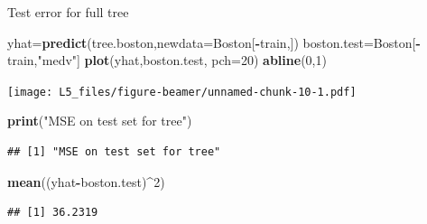\documentclass[
  ignorenonframetext,
]{beamer}
\newenvironment{Shaded}{\begin{snugshade}}{\end{snugshade}}
\newcommand{\DataTypeTok}[1]{\textcolor[rgb]{0.13,0.29,0.53}{#1}}
\newcommand{\DecValTok}[1]{\textcolor[rgb]{0.00,0.00,0.81}{#1}}
\newcommand{\KeywordTok}[1]{\textcolor[rgb]{0.13,0.29,0.53}{\textbf{#1}}}
\newcommand{\NormalTok}[1]{#1}
\newcommand{\OperatorTok}[1]{\textcolor[rgb]{0.81,0.36,0.00}{\textbf{#1}}}
\newcommand{\StringTok}[1]{\textcolor[rgb]{0.31,0.60,0.02}{#1}}
\begin{document}
\begin{frame}[fragile]

\begin{block}{Test error for full tree}

\begin{Shaded}
\begin{Highlighting}[]
\NormalTok{yhat=}\KeywordTok{predict}\NormalTok{(tree.boston,}\DataTypeTok{newdata=}\NormalTok{Boston[}\OperatorTok{-}\NormalTok{train,])}
\NormalTok{boston.test=Boston[}\OperatorTok{-}\NormalTok{train,}\StringTok{"medv"}\NormalTok{]}
\KeywordTok{plot}\NormalTok{(yhat,boston.test, }\DataTypeTok{pch=}\DecValTok{20}\NormalTok{)}
\KeywordTok{abline}\NormalTok{(}\DecValTok{0}\NormalTok{,}\DecValTok{1}\NormalTok{)}
\end{Highlighting}
\end{Shaded}

\texttt{[image: L5\_files/figure-beamer/unnamed-chunk-10-1.pdf]}

\begin{Shaded}
\begin{Highlighting}[]
\KeywordTok{print}\NormalTok{(}\StringTok{"MSE on test set for tree"}\NormalTok{)}
\end{Highlighting}
\end{Shaded}

\begin{verbatim}
## [1] "MSE on test set for tree"
\end{verbatim}

\begin{Shaded}
\begin{Highlighting}[]
\KeywordTok{mean}\NormalTok{((yhat}\OperatorTok{-}\NormalTok{boston.test)}\OperatorTok{^}\DecValTok{2}\NormalTok{)}
\end{Highlighting}
\end{Shaded}

\begin{verbatim}
## [1] 36.2319
\end{verbatim}

\end{block}

\end{frame}
\end{document}
